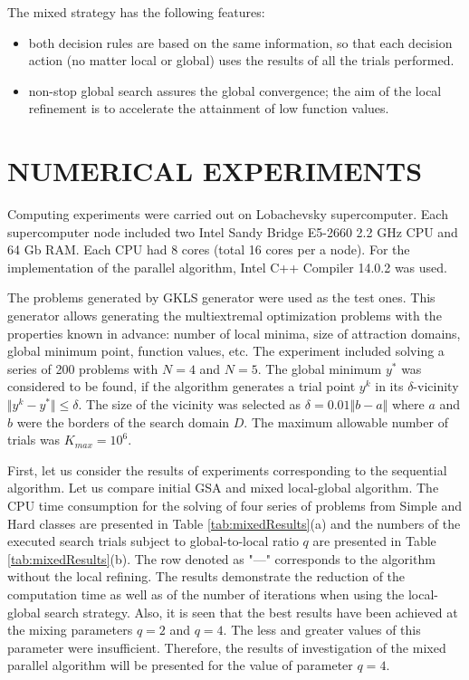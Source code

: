 \documentclass{aip-cp}
\begin{document}
The mixed strategy has the following features:

\begin{itemize}
\item both decision rules are based on the same information, so that each decision action (no matter local or global) uses the results of all the trials performed.
\item non-stop global search assures the global convergence; the aim of the local refinement is to accelerate the attainment of low function values.
\end{itemize}

\section{NUMERICAL EXPERIMENTS}
Computing experiments were carried out on Lobachevsky supercomputer. Each supercomputer node included two Intel Sandy Bridge E5-2660 2.2 GHz CPU and 64 Gb RAM. Each CPU had 8 cores (total 16 cores per a node). For the implementation of the parallel algorithm, Intel C++ Compiler 14.0.2 was used.

The problems generated by GKLS generator \citep{GKLS} were used as the test ones. This generator allows generating the multiextremal optimization problems with the properties known in advance: number of local minima, size of attraction domains, global minimum point, function values, etc. The experiment included solving a series of 200 problems with $N=4$ and $N=5$. The global minimum $y^*$ was considered to be found, if the algorithm generates a trial point $y^k$ in its $\delta$-vicinity $\Vert y^k-y^*\Vert\leqslant \delta$. The size of the vicinity was selected as $\delta=0.01\Vert b- a\Vert$ where $a$ and $b$ were the borders of the search domain $D$. The maximum allowable number of trials was $K_{max} = 10^6$.

First, let us consider the results of experiments corresponding to the sequential algorithm. Let us compare initial GSA and mixed local-global algorithm. The CPU time consumption for the solving of four series of problems from Simple and Hard classes are presented in Table \ref{tab:mixedResults}(a) and the numbers of the executed search trials subject to global-to-local ratio $q$ are presented in Table \ref{tab:mixedResults}(b). The row denoted as "---" corresponds to the algorithm without the local refining. The results demonstrate the reduction of the computation time as well as of the number of iterations when using the local-global search strategy. Also, it is seen that the best results have been achieved at the mixing parameters $q=2$ and $q=4$. The less and greater values of this parameter were insufficient. Therefore, the results of investigation of the mixed parallel algorithm will be presented for the value of parameter $q=4$.
\end{document}

